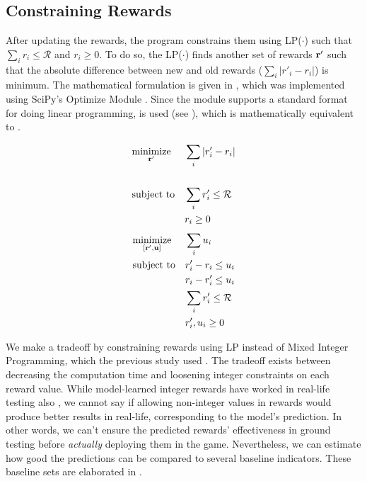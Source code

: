 \subsection{Constraining Rewards} \label{sec:Constraining Rewards}
After updating the rewards, the program constrains them using LP($\cdot$) such that $\sum_{i}r_i \leq \mathcal{R}$ and $r_i \geq 0$. To do so, the LP($\cdot$) finds another set of rewards $\mathbf{r'}$ such that the absolute difference between new and old rewards ($\sum_{i}|r'_i - r_i|$) is minimum. The mathematical formulation is given in , which was implemented using SciPy's Optimize Module \cite{SCPOptimizeDocs}. Since the module supports a standard format for doing linear programming,  is used (see ), which is mathematically equivalent to .
\begin{multicols}{2}
    \begin{equation} \label{eqn:lp_math_constrain_rewards}
        \begin{aligned}
            & \underset{\mathbf{r'}}{\text{minimize}}
            & & \sum_{i}|r'_i - r_i|\\ \\
            & \text{subject to}
            & & \sum_{i}r'_i \leq \mathcal{R}\\
            &&& r_i \geq 0
        \end{aligned}
    \end{equation}
    \begin{equation} \label{eqn:lp_code_constrain_rewards}
        \begin{aligned}
            & \underset{[\mathbf{r'}, \mathbf{u}]}{\text{minimize}}
            & & \sum_{i} u_i\\
            & \text{subject to}
            & & r'_i - r_i \leq u_i\\
            &&& r_i - r'_i \leq u_i\\
            &&& \sum_{i} r'_i \leq \mathcal{R}\\
            &&& r'_i, u_i \geq 0
        \end{aligned}
    \end{equation}
\end{multicols}

We make a tradeoff by constraining rewards using LP instead of Mixed Integer Programming, which the previous study used \cite{Xue2016Avi2}. The tradeoff exists between decreasing the computation time and loosening integer constraints on each reward value. While model-learned integer rewards have worked in real-life testing also \cite{Xue2016Avi2}, we cannot say if allowing non-integer values in rewards would produce better results in real-life, corresponding to the model's prediction. In other words, we can't ensure the predicted rewards' effectiveness in ground testing before \textit{actually} deploying them in the game. Nevertheless, we can estimate how good the predictions can be compared to several baseline indicators. These baseline sets are elaborated in .